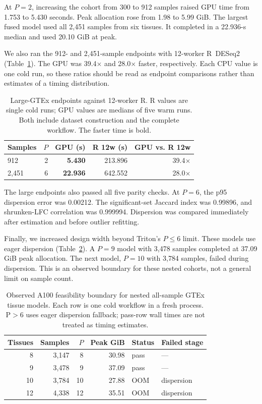 \documentclass[12pt]{article}
\newcommand{\fact}[1]{#1}
\begin{document}
At $P=2$, increasing the cohort from 300 to 912 samples raised GPU time from
1.753 to 5.430 seconds. Peak allocation rose from 1.98 to 5.99 GiB. The largest
fused model used all \fact{2{,}451} samples from six tissues. It completed in a
\fact{22.936-s} median and used \fact{20.10 GiB} at peak.

We also ran the 912- and 2{,}451-sample endpoints with 12-worker R~DESeq2
(Table~\ref{tab:gtexrendpoint}). The GPU was \fact{39.4$\times$} and
\fact{28.0$\times$} faster, respectively. Each CPU value is one cold run, so
these ratios should be read as endpoint comparisons rather than estimates of a
timing distribution.

\begin{table}[htbp]\centering
\caption{Large-GTEx endpoints against 12-worker R. R values are single cold
runs; GPU values are medians of five warm runs. Both include dataset
construction and the complete workflow. The faster time is bold.}
\label{tab:gtexrendpoint}
{\footnotesize
\begin{tabular}{lrrrr}
\toprule
Samples & $P$ & GPU (s) & R 12w (s) & GPU vs. R 12w \\\midrule
912 & 2 & \textbf{5.430} & 213.896 & 39.4$\times$ \\
2{,}451 & 6 & \textbf{22.936} & 642.552 & 28.0$\times$ \\\bottomrule
\end{tabular}}
\end{table}

The large endpoints also passed all five parity checks. At $P=6$, the p95
dispersion error was \fact{0.00212}. The significant-set Jaccard index was
\fact{0.99896}, and shrunken-LFC correlation was \fact{0.999994}. Dispersion
was compared immediately after estimation and before outlier refitting.

Finally, we increased design width beyond Triton's $P\leq6$ limit. These models
use eager dispersion (Table~\ref{tab:gtexoom}). A $P=9$ model with 3{,}478
samples completed at \fact{37.09 GiB} peak allocation. The next model, $P=10$
with 3{,}784 samples, failed during dispersion. This is an observed boundary
for these nested cohorts, not a general limit on sample count.

\begin{table}[htbp]\centering
\caption{Observed A100 feasibility boundary for nested all-sample GTEx tissue
models. Each row is one cold workflow in a fresh process. P$>6$ uses eager
dispersion fallback; pass-row wall times are not treated as timing estimates.}
\label{tab:gtexoom}
{\footnotesize
\begin{tabular}{rrrrll}
\toprule
Tissues & Samples & $P$ & Peak GiB & Status & Failed stage \\\midrule
8  & 3{,}147 & 8  & 30.98 & pass & --- \\
9  & 3{,}478 & 9  & 37.09 & pass & --- \\
10 & 3{,}784 & 10 & 27.88 & OOM  & dispersion \\
12 & 4{,}338 & 12 & 35.51 & OOM  & dispersion \\\bottomrule
\end{tabular}}
\end{table}
\end{document}
